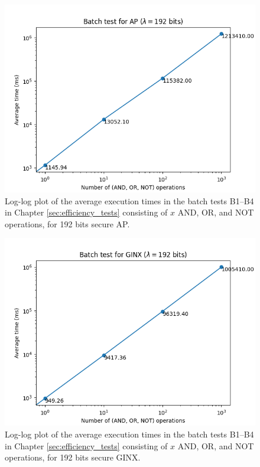 \begin{figure}[ht]
    \centering
    \includegraphics[width=0.8\linewidth]{data/figures/AP_STD192_batch.png}
    \caption{Log-log plot of the average execution times in the batch tests B1--B4 in Chapter \ref{sec:efficiency_tests} consisting of $x$ AND, OR, and NOT operations, for 192 bits secure AP.}
    \label{fig:batch_ap192}
\end{figure}

\begin{figure}[ht]
    \centering
    \includegraphics[width=0.8\linewidth]{data/figures/GINX_STD192_batch.png}
    \caption{Log-log plot of the average execution times in the batch tests B1--B4 in Chapter \ref{sec:efficiency_tests} consisting of $x$ AND, OR, and NOT operations, for 192 bits secure GINX.}
    \label{fig:batch_ginx192}
\end{figure}

